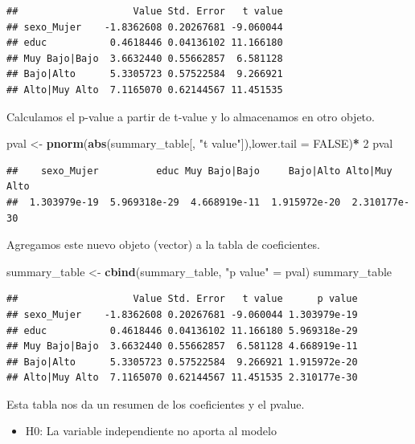 \documentclass[
]{article}
\newenvironment{Shaded}{\begin{snugshade}}{\end{snugshade}}
\newcommand{\AttributeTok}[1]{\textcolor[rgb]{0.13,0.29,0.53}{#1}}
\newcommand{\ConstantTok}[1]{\textcolor[rgb]{0.56,0.35,0.01}{#1}}
\newcommand{\DecValTok}[1]{\textcolor[rgb]{0.00,0.00,0.81}{#1}}
\newcommand{\FunctionTok}[1]{\textcolor[rgb]{0.13,0.29,0.53}{\textbf{#1}}}
\newcommand{\NormalTok}[1]{#1}
\newcommand{\OtherTok}[1]{\textcolor[rgb]{0.56,0.35,0.01}{#1}}
\newcommand{\SpecialCharTok}[1]{\textcolor[rgb]{0.81,0.36,0.00}{\textbf{#1}}}
\newcommand{\StringTok}[1]{\textcolor[rgb]{0.31,0.60,0.02}{#1}}
\providecommand{\tightlist}{%
  \setlength{\itemsep}{0pt}\setlength{\parskip}{0pt}}
\begin{document}
\begin{verbatim}
##                    Value Std. Error   t value
## sexo_Mujer    -1.8362608 0.20267681 -9.060044
## educ           0.4618446 0.04136102 11.166180
## Muy Bajo|Bajo  3.6632440 0.55662857  6.581128
## Bajo|Alto      5.3305723 0.57522584  9.266921
## Alto|Muy Alto  7.1165070 0.62144567 11.451535
\end{verbatim}

Calculamos el p-value a partir de t-value y lo almacenamos en otro
objeto.

\begin{Shaded}
\begin{Highlighting}[]
\NormalTok{pval }\OtherTok{\textless{}{-}} \FunctionTok{pnorm}\NormalTok{(}\FunctionTok{abs}\NormalTok{(summary\_table[, }\StringTok{"t value"}\NormalTok{]),}\AttributeTok{lower.tail =} \ConstantTok{FALSE}\NormalTok{)}\SpecialCharTok{*} \DecValTok{2}
\NormalTok{pval}
\end{Highlighting}
\end{Shaded}

\begin{verbatim}
##    sexo_Mujer          educ Muy Bajo|Bajo     Bajo|Alto Alto|Muy Alto 
##  1.303979e-19  5.969318e-29  4.668919e-11  1.915972e-20  2.310177e-30
\end{verbatim}

Agregamos este nuevo objeto (vector) a la tabla de coeficientes.

\begin{Shaded}
\begin{Highlighting}[]
\NormalTok{summary\_table }\OtherTok{\textless{}{-}} \FunctionTok{cbind}\NormalTok{(summary\_table, }\StringTok{"p value"} \OtherTok{=}\NormalTok{ pval)}
\NormalTok{summary\_table}
\end{Highlighting}
\end{Shaded}

\begin{verbatim}
##                    Value Std. Error   t value      p value
## sexo_Mujer    -1.8362608 0.20267681 -9.060044 1.303979e-19
## educ           0.4618446 0.04136102 11.166180 5.969318e-29
## Muy Bajo|Bajo  3.6632440 0.55662857  6.581128 4.668919e-11
## Bajo|Alto      5.3305723 0.57522584  9.266921 1.915972e-20
## Alto|Muy Alto  7.1165070 0.62144567 11.451535 2.310177e-30
\end{verbatim}

Esta tabla nos da un resumen de los coeficientes y el pvalue.

\begin{itemize}
\tightlist
\item
  H0: La variable independiente no aporta al modelo
\end{itemize}
\end{document}
